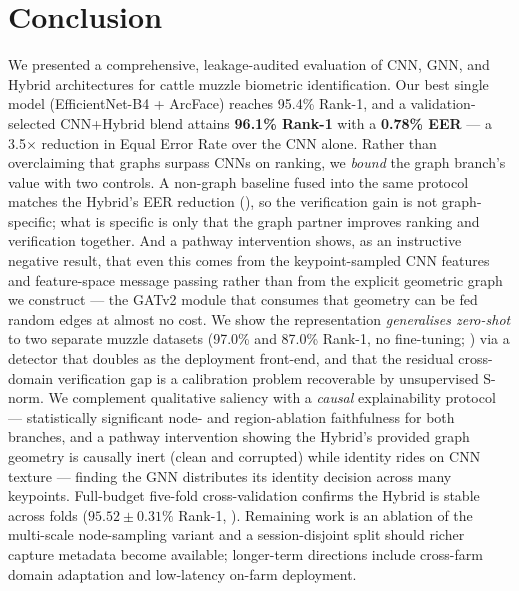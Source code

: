 \documentclass[11pt]{article}
\begin{document}
\section{Conclusion}
We presented a comprehensive, leakage-audited evaluation of CNN, GNN, and Hybrid
architectures for cattle muzzle biometric identification. Our best single model
(EfficientNet-B4 + ArcFace) reaches 95.4\% Rank-1, and a validation-selected CNN+Hybrid
blend attains \textbf{96.1\% Rank-1} with a \textbf{0.78\% EER} --- a 3.5$\times$ reduction
in Equal Error Rate over the CNN alone. Rather than overclaiming that graphs surpass CNNs on
ranking, we \emph{bound} the graph branch's value with two controls. A non-graph baseline fused into the same protocol matches the Hybrid's EER reduction (), so the verification gain is not graph-specific; what is specific is only that the graph partner improves ranking and verification together. And a pathway intervention shows, as an instructive negative result, that even this comes from the keypoint-sampled CNN features and feature-space message passing rather than from the explicit geometric graph we construct --- the GATv2 module that consumes that geometry can be fed random edges at almost no cost. We show
the representation \emph{generalises zero-shot} to two separate muzzle datasets (97.0\% and
87.0\% Rank-1, no fine-tuning; ) via a detector that doubles as the
deployment front-end, and that the residual cross-domain verification gap is a calibration
problem recoverable by unsupervised S-norm. We complement qualitative saliency with a
\emph{causal} explainability protocol --- statistically significant node- and region-ablation
faithfulness for both branches, and a pathway intervention showing the Hybrid's provided graph
geometry is causally inert (clean and corrupted) while identity rides on CNN texture ---
finding the GNN distributes its identity decision across many keypoints. Full-budget five-fold
cross-validation confirms the Hybrid is stable across folds ($95.52\pm0.31\%$ Rank-1,
). Remaining work is an ablation of the multi-scale node-sampling variant and a
session-disjoint split should richer capture metadata become available; longer-term
directions include cross-farm domain adaptation and low-latency on-farm deployment.

\end{document}
